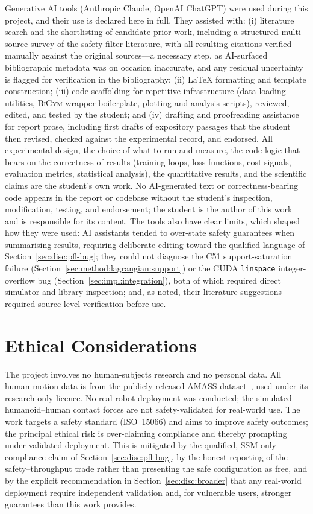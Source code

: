 \documentclass[11pt,a4paper]{report}
\newcommand{\ssm}{SSM}
\newcommand{\iso}{ISO~15066}
\newcommand{\bigym}{\textsc{BiGym}}
\begin{document}
Generative AI tools (Anthropic Claude, OpenAI ChatGPT) were used during
this project, and their use is declared here in full. They assisted
with: (i) literature search and the shortlisting of candidate prior
work, including a structured multi-source survey of the safety-filter
literature, with all resulting citations verified manually against the
original sources---a necessary step, as AI-surfaced bibliographic
metadata was on occasion inaccurate, and any residual uncertainty is
flagged for verification in the bibliography; (ii) \LaTeX{} formatting
and template construction; (iii) code scaffolding for repetitive
infrastructure (data-loading utilities, \bigym{} wrapper boilerplate,
plotting and analysis scripts), reviewed, edited, and tested by the
student; and (iv) drafting and proofreading assistance for report prose,
including first drafts of expository passages that the student then
revised, checked against the experimental record, and endorsed. All
experimental design, the choice of what to run and measure, the code
logic that bears on the correctness of results (training loops, loss
functions, cost signals, evaluation metrics, statistical analysis), the
quantitative results, and the scientific claims are the student's own
work. No AI-generated text or correctness-bearing code appears in the
report or codebase without the student's inspection, modification,
testing, and endorsement; the student is the author of this work and is
responsible for its content. The tools also have clear limits, which
shaped how they were used: AI assistants tended to over-state safety
guarantees when summarising results, requiring deliberate editing toward
the qualified language of Section~\ref{sec:disc:pfl-bug}; they could not
diagnose the C51 support-saturation failure
(Section~\ref{sec:method:lagrangian:support}) or the CUDA
\texttt{linspace} integer-overflow bug
(Section~\ref{sec:impl:integration}), both of which required direct
simulator and library inspection; and, as noted, their literature
suggestions required source-level verification before use.

\chapter{Ethical Considerations}
\label{app:ethics}

The project involves no human-subjects research and no personal data.
All human-motion data is from the publicly released AMASS
dataset~\cite{mahmood2019amass}, used under its research-only licence. No
real-robot deployment was conducted; the simulated humanoid--human
contact forces are not safety-validated for real-world use. The work
targets a safety standard (\iso{}) and aims to improve safety outcomes;
the principal ethical risk is over-claiming compliance and thereby
prompting under-validated deployment. This is mitigated by the qualified,
\ssm{}-only compliance claim of Section~\ref{sec:disc:pfl-bug}, by the
honest reporting of the safety--throughput trade rather than presenting
the safe configuration as free, and by the explicit recommendation in
Section~\ref{sec:disc:broader} that any real-world deployment require
independent validation and, for vulnerable users, stronger guarantees
than this work provides.
\end{document}
